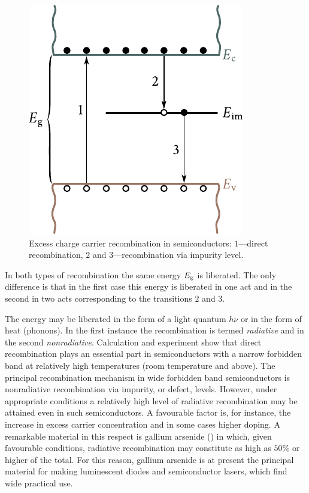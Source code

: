 \begin{figure}[t]
	\begin{center}
		\includegraphics[scale=1]{figures/ch_05/fig_5_23.pdf}
		\caption[]{Excess charge carrier recombination in semiconductors: $1$---direct recombination, $2$ and $3$---recombination via impurity level.}
		\label{fig:5_23}
	\end{center}
	\vspace{-0.7cm}
\end{figure}

In both types of recombination the same energy $E_{\text{g}}$ is liberated. The only difference is that in the first case this energy is liberated in one act and in the second in two acts corresponding to the transitions $2$ and $3$.

The energy may be liberated in the form of a light quantum $h\nu$ or in the form of heat (phonons). In the first instance the recombination is termed \textit{radiative} and in the second \textit{nonradiative}. Calculation and experiment show that direct recombination plays an essential part in
semiconductors with a narrow forbidden band at relatively high temperatures (room temperature and above). The principal recombination mechanism in wide forbidden band semiconductors is nonradiative recombination via impurity, or defect, levels. However, under appropriate conditions a relatively high level of radiative recombination may be attained even in such semiconductors. A favourable factor is, for instance, the increase in excess carrier concentration and in some cases higher doping. A remarkable material in this respect is gallium arsenide () in which, given favourable conditions, radiative recombination may constitute as high as $50\%$ or higher of the total. For this reason, gallium arsenide is at present the principal material for making luminescent diodes and
semiconductor lasers, which find wide practical use.
